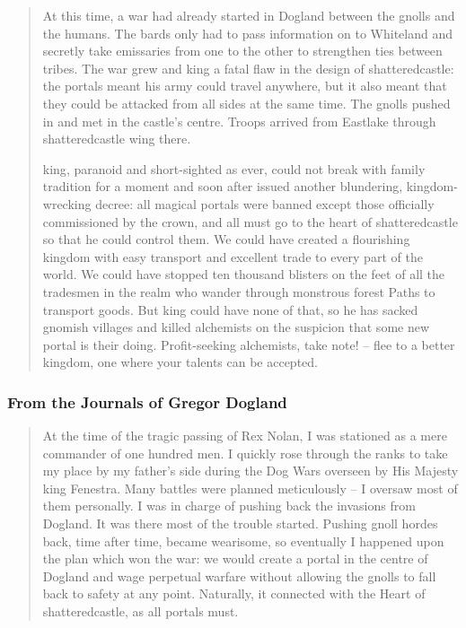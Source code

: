 \begin{multicols}{2}
\begin{quotation}
	At this time, a war had already started in Dogland between the gnolls and the humans.
	The bards only had to pass information on to Whiteland and secretly take emissaries from one to the other to strengthen ties between tribes.
	The war grew and \gls{king} a fatal flaw in the design of \gls{shatteredcastle}: the portals meant his army could travel anywhere, but it also meant that they could be attacked from all sides at the same time.
	The gnolls pushed in and met in the castle's centre.
	Troops arrived from Eastlake through \gls{shatteredcastle} wing there.

	\Gls{king}, paranoid and short-sighted as ever, could not break with family tradition for a moment and soon after issued another blundering, kingdom-wrecking decree: all magical portals were banned except those officially commissioned by the crown, and all must go to the heart of \gls{shatteredcastle} so that he could control them.
	We could have created a flourishing kingdom with easy transport and excellent trade to every part of the world.
	We could have stopped ten thousand blisters on the feet of all the tradesmen in the realm who wander through monstrous forest Paths to transport goods.
	But \gls{king} could have none of that, so he has sacked gnomish villages and killed alchemists on the suspicion that some new portal is their doing.
	Profit-seeking alchemists, take note! -- flee to a better kingdom, one where your talents can be accepted.

\end{quotation}

\subsubsection{From the Journals of Gregor Dogland}


\begin{quotation}

	At the time of the tragic passing of Rex Nolan, I was stationed as a mere commander of one hundred men.
	I quickly rose through the ranks to take my place by my father's side during the Dog Wars overseen by His Majesty \gls{king} Fenestra.
	Many battles were planned meticulously -- I oversaw most of them personally.
	I was in charge of pushing back the invasions from Dogland.
	It was there most of the trouble started.
	Pushing gnoll hordes back, time after time, became wearisome, so eventually I happened upon the plan which won the war: we would create a portal in the centre of Dogland and wage perpetual warfare without allowing the gnolls to fall back to safety at any point.
	Naturally, it connected with the Heart of \gls{shatteredcastle}, as all portals must.


\end{quotation}
\end{multicols}
